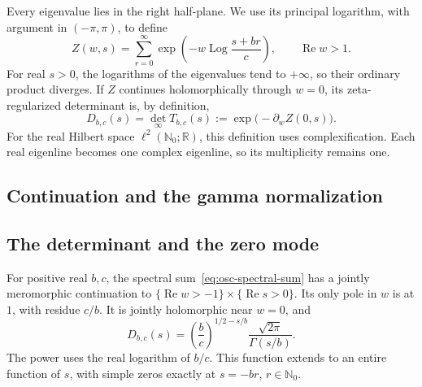 Every eigenvalue lies in the right half-plane. We use its principal
logarithm, with argument in \((-\pi,\pi)\), to define
\begin{equation}
 Z(w,s)=\sum_{r=0}^{\infty}
 \exp\left(-w\operatorname{Log}\frac{s+br}{c}\right),
 \qquad \operatorname{Re}w>1.                     \label{eq:osc-spectral-sum}
\end{equation}
For real \(s>0\), the logarithms of the eigenvalues tend to \(+\infty\),
so their ordinary product diverges. If \(Z\) continues holomorphically
through \(w=0\), its zeta-regularized determinant is, by definition,
\begin{equation}
 D_{b,c}(s)=\det_\infty T_{b,c}(s)
 :=\exp\bigl(-\partial_w Z(0,s)\bigr).             \label{eq:osc-det-definition}
\end{equation}
For the real Hilbert space \(\ell^2(\mathbb N_0;\mathbb R)\), this
definition uses complexification. Each real eigenline becomes one complex
eigenline, so its multiplicity remains one.

\subsection{Continuation and the gamma normalization}



\subsection{The determinant and the zero mode}

\begin{theorem}
\label{thm:osc-det}\label{prop:oscillator-det}
For positive real \(b,c\), the spectral sum~\eqref{eq:osc-spectral-sum}
has a jointly meromorphic continuation to
\(\{\operatorname{Re}w>-1\}\times\{\operatorname{Re}s>0\}\).
Its only pole in \(w\) is at \(1\), with residue \(c/b\).
It is jointly holomorphic near \(w=0\), and
\begin{equation}
 D_{b,c}(s)
 =\left(\frac bc\right)^{1/2-s/b}
       \frac{\sqrt{2\pi}}{\Gamma(s/b)}.
 \label{eq:osc-det-formula}
\end{equation}
The power uses the real logarithm of \(b/c\).
This function extends to an entire function of \(s\), with simple zeros
exactly at \(s=-br\), \(r\in\mathbb N_0\).
\end{theorem}

